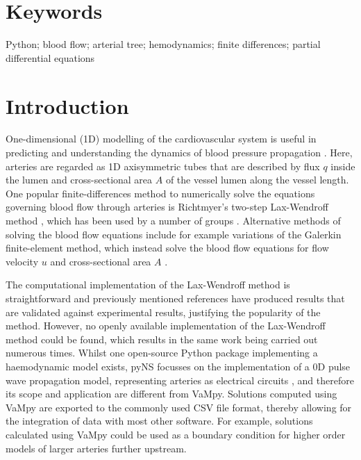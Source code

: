 \documentclass{jors}
\begin{document}
\section*{Keywords}
Python; blood flow; arterial tree; hemodynamics; finite differences; partial differential equations

\section*{Introduction}

One-dimensional (1D) modelling of the cardiovascular system is useful in predicting and understanding the dynamics of blood pressure propagation \cite{Olufsen2000,Sherwin2003a,Alastruey2007,Kolachalama2007,Cousins2014,Diem2016a}. Here, arteries are regarded as 1D axisymmetric tubes that are described by flux $q$ inside the lumen and cross-sectional area $A$ of the vessel lumen along the vessel length. One popular finite-differences method to numerically solve the equations governing blood flow through arteries is Richtmyer's two-step Lax-Wendroff method \cite{LeVeque1992,Richtmyer1963}, which has been used by a number of groups \cite{Olufsen2000,Kolachalama2007,Diem2016a,Smith2002,Azer2007,Itu2011}. Alternative methods of solving the blood flow equations include for example variations of the Galerkin finite-element method, which instead solve the blood flow equations for flow velocity $u$ and cross-sectional area $A$ \cite{Sherwin2003a,Mynard2008}.

The computational implementation of the Lax-Wendroff method is straightforward and previously mentioned references have produced results that are validated against experimental results, justifying the popularity of the method. However, no openly available implementation of the Lax-Wendroff method could be found, which results in the same work being carried out numerous times. Whilst one open-source Python package implementing a haemodynamic model exists, pyNS focusses on the implementation of a 0D pulse wave propagation model, representing arteries as electrical circuits \cite{Manini2015}, and therefore its scope and application are different from VaMpy. Solutions computed using VaMpy are exported to the commonly used CSV file format, thereby allowing for the integration of data with most other software. For example, solutions calculated using VaMpy could be used as a boundary condition for higher order models of larger arteries further upstream.
\end{document}
